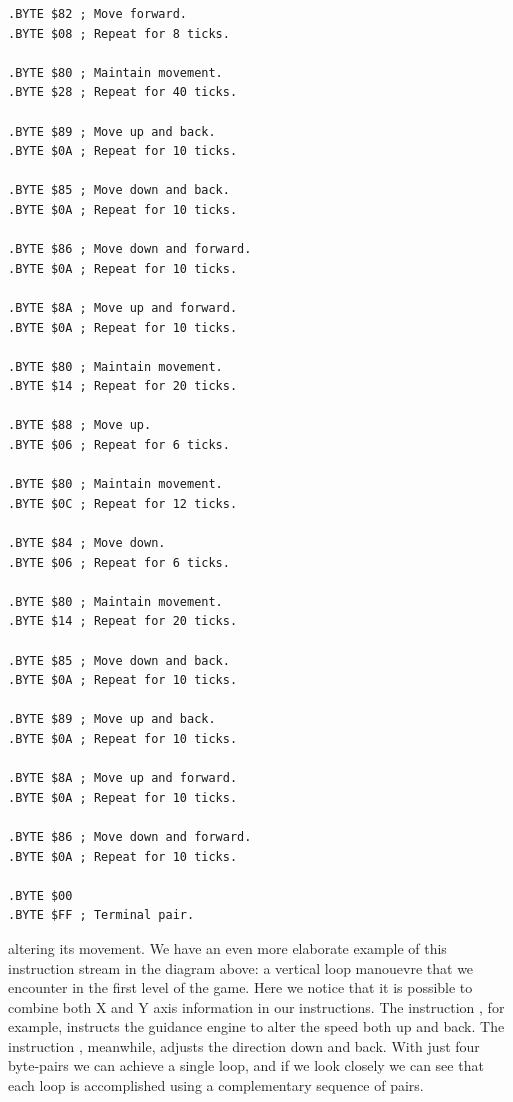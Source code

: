 \begin{minipage}[c]{0.48\linewidth}
\begin{lstlisting}[basicstyle=\scriptsize\ttfamily]
.BYTE $82 ; Move forward.
.BYTE $08 ; Repeat for 8 ticks.
                                 
.BYTE $80 ; Maintain movement.
.BYTE $28 ; Repeat for 40 ticks.

.BYTE $89 ; Move up and back.
.BYTE $0A ; Repeat for 10 ticks.

.BYTE $85 ; Move down and back.
.BYTE $0A ; Repeat for 10 ticks.

.BYTE $86 ; Move down and forward.
.BYTE $0A ; Repeat for 10 ticks.

.BYTE $8A ; Move up and forward.
.BYTE $0A ; Repeat for 10 ticks.

.BYTE $80 ; Maintain movement.
.BYTE $14 ; Repeat for 20 ticks.

.BYTE $88 ; Move up.
.BYTE $06 ; Repeat for 6 ticks.

.BYTE $80 ; Maintain movement.
.BYTE $0C ; Repeat for 12 ticks.

.BYTE $84 ; Move down.
.BYTE $06 ; Repeat for 6 ticks.

.BYTE $80 ; Maintain movement.
.BYTE $14 ; Repeat for 20 ticks.

.BYTE $85 ; Move down and back.
.BYTE $0A ; Repeat for 10 ticks.

.BYTE $89 ; Move up and back.
.BYTE $0A ; Repeat for 10 ticks.

.BYTE $8A ; Move up and forward.
.BYTE $0A ; Repeat for 10 ticks.

.BYTE $86 ; Move down and forward.
.BYTE $0A ; Repeat for 10 ticks.

.BYTE $00
.BYTE $FF ; Terminal pair.

\end{lstlisting}
\end{minipage}
\vspace{-0.9cm}

altering its movement. We have an even more elaborate example of this
instruction stream in the diagram above: a vertical loop manouevre that we
encounter in the first level of the game. Here we notice that it is possible to
combine both X and Y axis information in our instructions. The instruction
, for example, instructs the guidance engine to alter the speed
both up and back. The instruction ,
meanwhile, adjusts the direction down and back. With just four byte-pairs we
can achieve a single loop, and if we look closely we can see that each loop
is accomplished using a complementary sequence of pairs.

